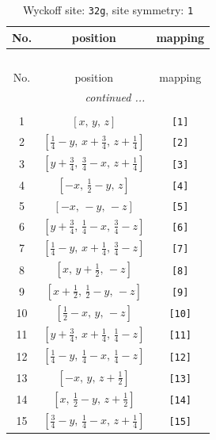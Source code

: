 \documentclass[fleqn,8pt]{jsarticle}
\begin{document}
\renewcommand{\arraystretch}{1.2}
\begin{longtable}{ccc}
\caption{Wyckoff site: {\tt 32g}, site symmetry: {\tt 1}}
 \\
 \hline \hline
No. & position & mapping \\ \hline \endfirsthead

\multicolumn{2}{l}{\tablename\ \thetable{}} \\
 \hline \hline
No. & position & mapping \\ \hline \endhead

 \hline \hline
\multicolumn{2}{r}{\footnotesize\it continued ...} \\ \endfoot

 \hline \hline
\multicolumn{2}{r}{} \\ \endlastfoot

1 & $\left[ x,\, y,\, z \right]$ & {\tt [1]} \\ \hline
2 & $\left[ \frac{1}{4} - y,\, x + \frac{3}{4},\, z + \frac{1}{4} \right]$ & {\tt [2]} \\ \hline
3 & $\left[ y + \frac{3}{4},\, \frac{3}{4} - x,\, z + \frac{1}{4} \right]$ & {\tt [3]} \\ \hline
4 & $\left[ - x,\, \frac{1}{2} - y,\, z \right]$ & {\tt [4]} \\ \hline
5 & $\left[ - x,\, - y,\, - z \right]$ & {\tt [5]} \\ \hline
6 & $\left[ y + \frac{3}{4},\, \frac{1}{4} - x,\, \frac{3}{4} - z \right]$ & {\tt [6]} \\ \hline
7 & $\left[ \frac{1}{4} - y,\, x + \frac{1}{4},\, \frac{3}{4} - z \right]$ & {\tt [7]} \\ \hline
8 & $\left[ x,\, y + \frac{1}{2},\, - z \right]$ & {\tt [8]} \\ \hline
9 & $\left[ x + \frac{1}{2},\, \frac{1}{2} - y,\, - z \right]$ & {\tt [9]} \\ \hline
10 & $\left[ \frac{1}{2} - x,\, y,\, - z \right]$ & {\tt [10]} \\ \hline
11 & $\left[ y + \frac{3}{4},\, x + \frac{1}{4},\, \frac{1}{4} - z \right]$ & {\tt [11]} \\ \hline
12 & $\left[ \frac{1}{4} - y,\, \frac{1}{4} - x,\, \frac{1}{4} - z \right]$ & {\tt [12]} \\ \hline
13 & $\left[ - x,\, y,\, z + \frac{1}{2} \right]$ & {\tt [13]} \\ \hline
14 & $\left[ x,\, \frac{1}{2} - y,\, z + \frac{1}{2} \right]$ & {\tt [14]} \\ \hline
15 & $\left[ \frac{3}{4} - y,\, \frac{1}{4} - x,\, z + \frac{1}{4} \right]$ & {\tt [15]} \\ \hline

\end{longtable}
\end{document}
